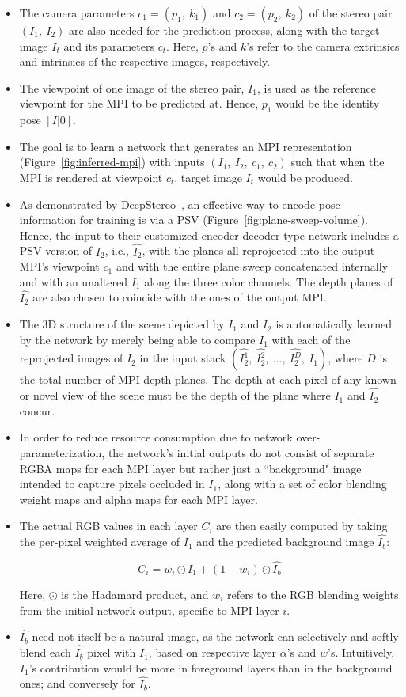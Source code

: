 \begin{itemize}
    \item The camera parameters $c_1 = (p_1,\ k_1)$ and $c_2 = (p_2,\ k_2)$ of the stereo pair $(I_1,\ I_2)$ are also needed for the prediction process, along with the target image $I_t$ and its parameters $c_t$. Here, $p$'s and $k$'s refer to the camera extrinsics and intrinsics of the respective images, respectively.
    \item The viewpoint of one image of the stereo pair, $I_1$, is used as the reference viewpoint for the MPI to be predicted at. Hence, $p_1$ would be the identity pose $[I|\boldsymbol{\mathit{0}}]$.
    \item The goal is to learn a network that generates an MPI representation (Figure~\ref{fig:inferred-mpi}) with inputs $(I_1,\ I_2,\ c_1,\ c_2)$ such that when the MPI is rendered at viewpoint $c_t$, target image $I_t$ would be produced. 
    \item As demonstrated by DeepStereo~\cite{deep_stereo_2016}, an effective way to encode pose information for training is via a PSV (Figure~\ref{fig:plane-sweep-volume}). Hence, the input to their customized encoder-decoder type network includes a PSV version of $I_2$, i.e., $\hat{I_2}$, with the planes all reprojected into the output MPI's viewpoint $c_1$ and with the entire plane sweep concatenated internally and with an unaltered $I_1$ along the three color channels. The depth planes of $\hat{I_2}$ are also chosen to coincide with the ones of the output MPI.
    \item The 3D structure of the scene depicted by $I_1$ and $I_2$ is automatically learned by the network by merely being able to compare $I_1$ with each of the reprojected images of $I_2$ in the input stack $(\hat{I_2^1},\ \hat{I_2^2},\ \ldots,\ \hat{I_2^D},\  I_1)$, where $D$ is the total number of MPI depth planes. The depth at each pixel of any known or novel view of the scene must be the depth of the plane where $I_1$ and $\hat{I_2}$ concur.
    \item In order to reduce resource consumption due to network over-parameterization, the network's initial outputs do not consist of separate RGBA maps for each MPI layer but rather just a ``background" image intended to capture pixels occluded in $I_1$, along with a set of color blending weight maps and alpha maps for each MPI layer.
    \item The actual RGB values in each layer $C_i$ are then easily computed by taking the per-pixel weighted average of $I_1$ and the predicted background image $\hat{I_b}$:
    
    \[C_i = w_i \odot I_1 + (1 - w_i) \odot \hat{I_b}\]
    
    Here, $\odot$ is the Hadamard product, and $w_i$ refers to the RGB blending weights from the initial network output, specific to MPI layer $i$.
    \item $\hat{I_b}$ need not itself be a natural image, as the network can selectively and softly blend each $\hat{I_b}$ pixel with $I_1$, based on respective layer $\alpha$'s and $w$'s. Intuitively, $I_1$'s contribution would be more in foreground layers than in the background ones; and conversely for $\hat{I_b}$. 
\end{itemize}

